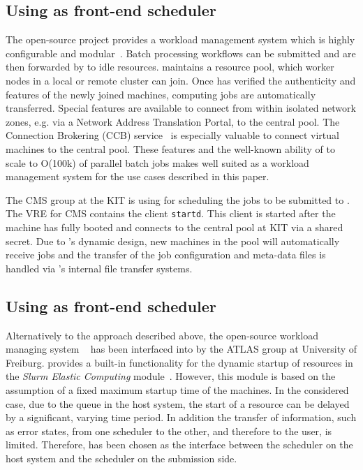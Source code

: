 \subsection{Using \HTCondor as front-end scheduler}\label{sec:ROCED:HTCondor}
The open-source project \HTCondor provides a workload management system which is highly configurable and modular~\cite{HTCondor}. Batch processing workflows can be submitted and are then forwarded by \HTCondor to idle resources. \HTCondor maintains a resource pool, which worker nodes in a local or remote cluster can join. Once \HTCondor has verified the authenticity and features of the newly joined machines, computing jobs are automatically transferred. Special features are available to connect from within isolated network zones, e.g. via a Network Address Translation Portal, to the central \HTCondor pool. The Connection Brokering (CCB) service~\cite{HTCondorCCB} is especially valuable to connect virtual machines to the central pool. These features and the well-known ability of \HTCondor to scale to O(100k) of parallel batch jobs makes \HTCondor well suited as a workload management system for the use cases described in this paper.

The CMS group at the KIT is using \HTCondor for scheduling the jobs to be submitted to \NEMO. The VRE for CMS contains the \HTCondor client \texttt{startd}.
This client is started after the machine has fully booted and connects to the central \HTCondor pool at KIT via a shared secret. Due to \HTCondor's dynamic design, new machines in the pool will automatically receive jobs and the transfer of the job configuration and meta-data files is handled via \HTCondor's internal file transfer systems.


\subsection{Using \Slurm as front-end scheduler}

Alternatively to the approach described above, the
open-source workload managing system \Slurm~\cite{Slurm} has been interfaced into \Roced by
the ATLAS group at University of Freiburg.
\Slurm provides a built-in functionality for the dynamic
startup of resources in the \textit{Slurm Elastic Computing}
module~\cite{SlurmElastic}.
However, this module is based on the assumption of a fixed maximum
startup time of the machines.
In the considered case, due to the queue in the host system, the start of a
resource can be delayed by a significant, varying time period.
In addition the transfer of information, such as error states, from one scheduler to the
other, and therefore to the user, is  limited.
Therefore, \Roced has been chosen as the interface between the
\Moab scheduler on the host system and the \Slurm
scheduler on the submission side.


